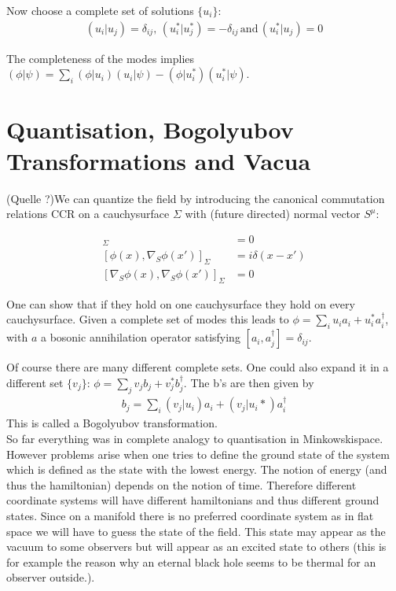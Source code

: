 Now choose a complete set of solutions $\{u_i\}$:
\begin{align}
(u_i| u_j) = \delta_{ij},\,(u_i^*| u_j^*) = -\delta_{ij}\,\text{and}\,(u_i^*| u_j) = 0
\end{align}

The completeness of the modes implies \((\phi|\psi) = \sum_i (\phi|u_i)(u_i|\psi) - (\phi|u_i^*)(u_i^*|\psi)\).

\section{Quantisation, Bogolyubov Transformations and Vacua}

(Quelle ?)We can quantize the field by introducing the canonical commutation relations CCR on a cauchysurface \(\Sigma\) with (future directed) normal vector $S^\mu$:

\begin{align}
[\phi(x),\phi(x')]_\Sigma &= 0\\
[\phi(x),\nabla_S \phi(x')]_\Sigma &= i\delta(x-x')\\
[\nabla_S \phi(x),\nabla_S \phi(x')]_\Sigma &= 0
\end{align}

One can show that if they hold on one cauchysurface they hold on every cauchysurface\cite{krishnan1011.5875}.
Given a complete set of modes this leads to \(\phi = \sum_i u_i a_i + u_i^* a_i^\dagger\), with \(a\) a bosonic annihilation operator satisfying \([a_i,a_j^\dagger] = \delta_{ij}\).

Of course there are many different complete sets. One could also expand it in a different set \(\{v_j\}\): \(\phi = \sum_j v_j b_j + v_j^* b_j^\dagger\). The b's are then given by 
\begin{align}
b_j = \sum_i (v_j|u_i) a_i + (v_j|u_i*) a_i^\dagger
\label{equ:qft_bogolyubov}
\end{align}
This is called a Bogolyubov transformation.\\

So far everything was in complete analogy to quantisation in Minkowskispace. However problems arise when one tries to define the ground state of the system which is defined as the state with the lowest energy. The notion of energy (and thus the hamiltonian) depends on the notion of time. Therefore different coordinate systems will have different hamiltonians and thus different ground states. Since on a manifold there is no preferred coordinate system as in flat space we will have to guess the state of the field. This state may appear as the vacuum to some observers but will appear as an excited state to others (this is for example the reason why an eternal black hole seems to be thermal for an observer outside.).\\

